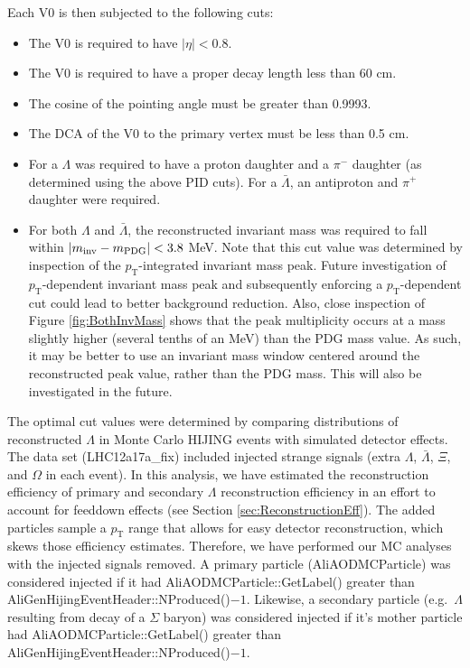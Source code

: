 Each V0 is then subjected to the following cuts:
\begin{itemize}
\item The V0 is required to have $|\eta| < 0.8$.
\item The V0 is required to have a proper decay length less than 60 cm.
\item The cosine of the pointing angle must be greater than 0.9993.
\item The DCA of the V0 to the primary vertex must be less than 0.5 cm.
\item For a $\Lambda$ was required to have a proton daughter and a $\pi^-$ daughter (as determined using the above PID cuts).  
For a $\bar{\Lambda}$, an antiproton and $\pi^+$ daughter were required.
\item For both $\Lambda$ and $\bar{\Lambda}$, the reconstructed invariant mass was required to fall within $\left\lvert m_\mathrm{inv}-m_\mathrm{PDG}\right\rvert < 3.8$ MeV.  
Note that this cut value was determined by inspection of the $p_\mathrm{T}$-integrated invariant mass peak.  
Future investigation of $p_\mathrm{T}$-dependent invariant mass peak and subsequently enforcing a $p_\mathrm{T}$-dependent cut could lead to better background reduction.  
Also, close inspection of Figure \ref{fig:BothInvMass} shows that the peak multiplicity occurs at a mass slightly higher (several tenths of an MeV) than the PDG mass value.  
As such, it may be better to use an invariant mass window centered around the reconstructed peak value, rather than the PDG mass.  
This will also be investigated in the future.
\end{itemize}

The optimal cut values were determined by comparing distributions of reconstructed $\Lambda$ in Monte Carlo HIJING events with simulated detector effects.  
The data set (LHC12a17a\_fix) included injected strange signals (extra $\Lambda$, $\bar{\Lambda}$, $\Xi$, and $\Omega$ in each event).  
In this analysis, we have estimated the reconstruction efficiency of primary and secondary $\Lambda$ reconstruction efficiency in an effort to account for feeddown effects (see Section \ref{sec:ReconstructionEff}).
The added particles sample a $p_\mathrm{T}$ range that allows for easy detector reconstruction, which skews those efficiency estimates.
Therefore, we have performed our MC analyses with  the injected signals removed.  A primary particle (AliAODMCParticle) was considered injected if it had AliAODMCParticle::GetLabel() greater than AliGenHijingEventHeader::NProduced()$-1$. 
Likewise, a secondary particle (e.g.\ $\Lambda$ resulting from decay of a $\Sigma$ baryon) was considered injected if it's mother particle had AliAODMCParticle::GetLabel() greater than AliGenHijingEventHeader::NProduced()$-1$.  


